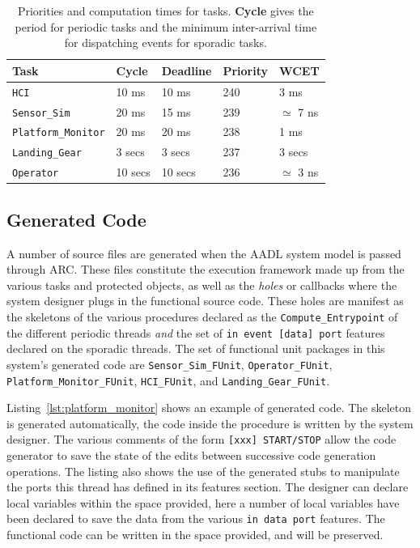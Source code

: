 \begin{table}
\centering
\begin{tabular}{|l|l|l|l|l|}
\hline
\textbf{Task} & \textbf{Cycle} & \textbf{Deadline} &
\textbf{Priority} & \textbf{WCET}\\
\hline
\texttt{HCI} & 10 ms & 10 ms & 240 & 3 ms\\
\texttt{Sensor\_Sim} & 20 ms & 15 ms & 239 & $\simeq$ 7 ns\\
\texttt{Platform\_Monitor} & 20 ms & 20 ms & 238 & 1 ms\\
\texttt{Landing\_Gear} & 3 secs & 3 secs & 237 & 3 secs\\
\texttt{Operator} & 10 secs & 10 secs & 236 & $\simeq$ 3 ns\\
\hline
\end{tabular}
\caption[Priorities and computation times for tasks.]{Priorities and
  computation times for tasks. \textbf{Cycle} gives the period for
  periodic tasks and the minimum inter-arrival time for dispatching
  events for sporadic tasks.}
\label{tab:task_set}
\end{table}

\subsection{Generated Code}
\label{sec:case_study_codegen}
A number of source files are generated when the AADL system model is
passed through ARC. These files constitute the execution framework
made up from the various tasks and protected objects, as well as the
\emph{holes} or callbacks where the system designer plugs in the
functional source code. These holes are manifest as the skeletons of
the various procedures declared as the \texttt{Compute\_Entrypoint} of
the different periodic threads \emph{and} the set of \texttt{in event
  [data] port} features declared on the sporadic threads. The set of
functional unit packages in this system's generated code are
\texttt{Sensor\_Sim\_FUnit}, \texttt{Operator\_FUnit},
\texttt{Platform\_Monitor\_FUnit}, \texttt{HCI\_FUnit}, and
\texttt{Landing\_Gear\_FUnit}. 

Listing~\ref{lst:platform_monitor} shows an example of generated
code. The skeleton is generated automatically, the code inside the
procedure is written by the system designer. The various comments of
the form \texttt{[xxx] START/STOP} allow the code generator to save
the state of the edits between successive code generation
operations. The listing also shows the use of the generated stubs to
manipulate the ports this thread has defined in its features
section. The designer can declare local variables within the space
provided, here a number of local variables have been declared to save
the data from the various \texttt{in data port} features. The
functional code can be written in the space provided, and will be
preserved.

